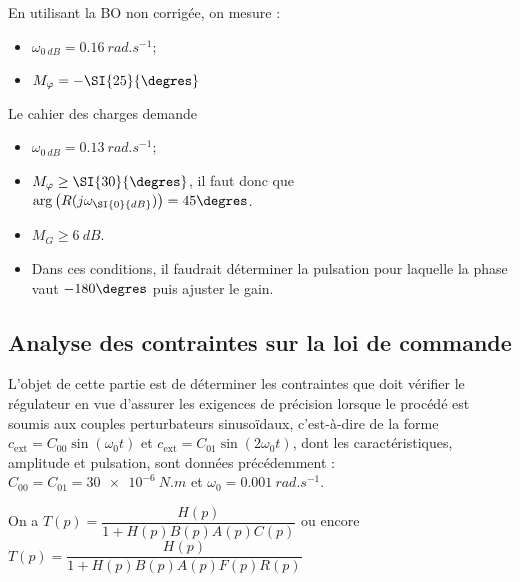 \ifprof
\begin{corrige}
En utilisant la BO non corrigée, on mesure :
\begin{itemize}
\item $\omega_{\SI{0}{dB}} = \SI{0,16}{rad.s^{-1}}$;
\item $M_{\varphi}=-\SI{25}{\degres}$
\end{itemize}
Le cahier des charges demande 
\begin{itemize}
\item $\omega_{\SI{0}{dB}} = \SI{0,13}{rad.s^{-1}}$;
\item $M_{\varphi}\geq \SI{30}{\degres}$, il faut donc que $\arg\left(R(j\omega_{\SI{0}{dB}}) \right)=45\degres$.
\item $M_{G}\geq \SI{6}{dB}$.
\item Dans ces conditions, il faudrait déterminer la pulsation pour laquelle la phase vaut $-180\degres$ puis ajuster le gain.
\end{itemize}
\end{corrige}
\else
\fi







\subsection{\label{sec:3:B} Analyse des contraintes sur la loi de commande}

\ifprof
\else

L’objet de cette partie est de déterminer les contraintes que doit vérifier le régulateur en vue d’assurer les
exigences de précision lorsque le procédé est soumis aux couples perturbateurs sinusoïdaux, c’est-à-dire de la
forme 
$c_{\text{ext}} = C_{00}\sin(\omega_0 t)$ et 
$c_{\text{ext}} = C_{01} \sin(2\omega_0t)$, 
dont les caractéristiques, amplitude et pulsation, sont données
précédemment : $C_{00} = C_{01} = \SI{30e-6}{N.m}$  et $\omega_0 = \SI{0,001}{rad.s^{-1}}$.
\fi


\ifprof
\begin{corrige}
On a $T(p)=\dfrac{H(p)}{1+H(p)B(p)A(p)C(p)}$ ou encore $T(p)=\dfrac{H(p)}{1+H(p)B(p)A(p)F(p)R(p)}$
\end{corrige}
\else
\fi

